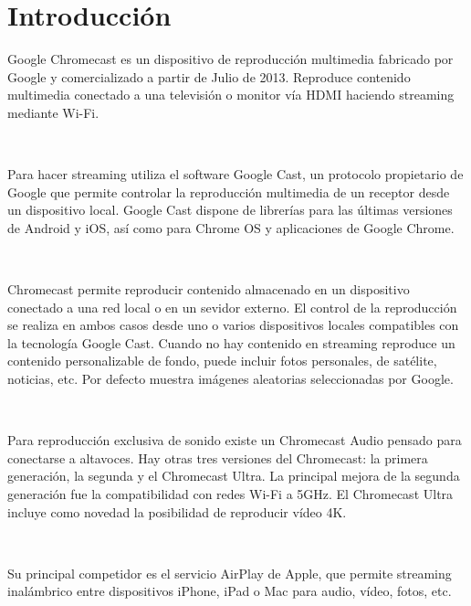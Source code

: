 \section{Introducción}
Google Chromecast es un dispositivo de reproducción multimedia fabricado por Google y comercializado a partir de Julio de 2013. Reproduce contenido multimedia conectado a una televisión o monitor vía HDMI haciendo streaming mediante Wi-Fi.

\

Para hacer streaming utiliza el software Google Cast, un protocolo propietario de Google que permite controlar la reproducción multimedia de un receptor desde un dispositivo local. Google Cast dispone de librerías para las últimas versiones de Android y iOS, así como para Chrome OS y aplicaciones de Google Chrome.

\

Chromecast permite reproducir contenido almacenado en un dispositivo conectado a una red local o en un sevidor externo. El control de la reproducción se realiza en ambos casos desde uno o varios dispositivos locales compatibles con la tecnología Google Cast. Cuando no hay contenido en streaming reproduce un contenido personalizable de fondo, puede incluir fotos personales,
de satélite, noticias, etc. Por defecto muestra imágenes aleatorias seleccionadas por Google.

\

Para reproducción exclusiva de sonido existe un Chromecast Audio pensado para conectarse a altavoces. Hay otras tres versiones del Chromecast: la primera generación, la segunda y el Chromecast Ultra. La principal mejora de la segunda generación fue la compatibilidad con redes Wi-Fi a 5GHz. El Chromecast Ultra incluye como novedad la posibilidad de reproducir vídeo 4K.

\

Su principal competidor es el servicio AirPlay de Apple, que permite streaming inalámbrico entre dispositivos iPhone, iPad o Mac para audio, vídeo, fotos, etc.
